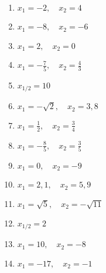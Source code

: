 \newpage
\begin{Answer}[ref=produktformNullstellenA1]

	\begin{minipage}{\textwidth}
		\begin{minipage}{0.5\textwidth}
			\begin{enumerate}[label=\alph*)]
				\item \(x_1=-2,\quad x_2=4\)
				\item \(x_1=-8,\quad x_2=-6\)
				\item \(x_1=2,\quad x_2=0\)
				\item \(x_1=-\frac{7}{5},\quad x_2=\frac{4}{3}\)
				\item \(x_{1/2}=10\)
				\item \(x_1=-\sqrt{2},\quad x_2=3,8\)
				\item \(x_1=\frac{1}{2},\quad x_2=\frac{3}{4}\)
			\end{enumerate}
		\end{minipage}%
		\begin{minipage}{0.5\textwidth}
			\begin{enumerate}[label=\alph*)]
				\setcounter{enumi}{7}
				\item \(x_1=-\frac{8}{5},\quad x_2=\frac{3}{5}\)
				\item \(x_1=0,\quad x_2=-9\)
				\item \(x_1=2,1,\quad x_2=5,9\)
				\item \(x_1=\sqrt{5},\quad x_2=-\sqrt{11}\)
				\item \(x_{1/2}=2\)
				\item \(x_1=10,\quad x_2=-8\)
				\item \(x_1=-17,\quad x_2=-1\)
			\end{enumerate}
		\end{minipage}%
	\end{minipage}%
\end{Answer}
